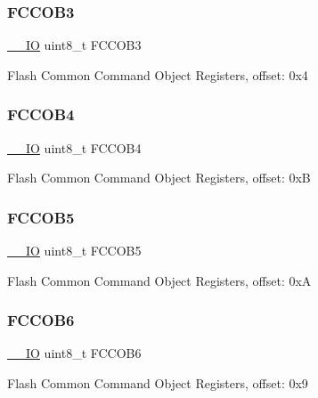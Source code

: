 \subsubsection{\texorpdfstring{FCCOB3}{FCCOB3}}
{\footnotesize\ttfamily \mbox{\hyperlink{core__cm0plus_8h_aec43007d9998a0a0e01faede4133d6be}{\+\_\+\+\_\+\+IO}} uint8\+\_\+t F\+C\+C\+O\+B3}

Flash Common Command Object Registers, offset\+: 0x4 \mbox{\label{struct_f_t_f_a___type_adfd02f97965934a771d87e054c1fde3e}} 
\subsubsection{\texorpdfstring{FCCOB4}{FCCOB4}}
{\footnotesize\ttfamily \mbox{\hyperlink{core__cm0plus_8h_aec43007d9998a0a0e01faede4133d6be}{\+\_\+\+\_\+\+IO}} uint8\+\_\+t F\+C\+C\+O\+B4}

Flash Common Command Object Registers, offset\+: 0xB \mbox{\label{struct_f_t_f_a___type_a94dea30a2694ee7f503572038ba68249}} 
\subsubsection{\texorpdfstring{FCCOB5}{FCCOB5}}
{\footnotesize\ttfamily \mbox{\hyperlink{core__cm0plus_8h_aec43007d9998a0a0e01faede4133d6be}{\+\_\+\+\_\+\+IO}} uint8\+\_\+t F\+C\+C\+O\+B5}

Flash Common Command Object Registers, offset\+: 0xA \mbox{\label{struct_f_t_f_a___type_a7355e1e5bbdc6795f789840a8b281087}} 
\subsubsection{\texorpdfstring{FCCOB6}{FCCOB6}}
{\footnotesize\ttfamily \mbox{\hyperlink{core__cm0plus_8h_aec43007d9998a0a0e01faede4133d6be}{\+\_\+\+\_\+\+IO}} uint8\+\_\+t F\+C\+C\+O\+B6}

Flash Common Command Object Registers, offset\+: 0x9 \mbox{\label{struct_f_t_f_a___type_a4fa927e3370c85b13ea9ad67312d3ec1}} 
